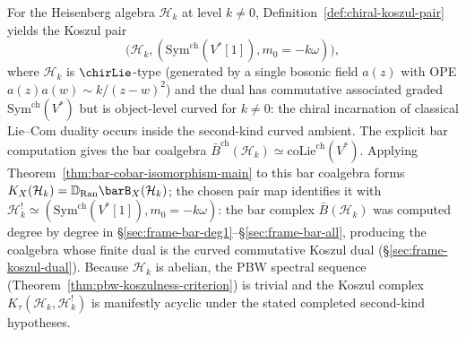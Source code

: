 \begin{example}\label{ex:heisenberg-koszul-pair}
For the Heisenberg algebra $\mathcal{H}_k$ at level $k \neq 0$,
Definition~\ref{def:chiral-koszul-pair} yields the Koszul pair
\[
\bigl(\mathcal{H}_k,
(\mathrm{Sym}^{\mathrm{ch}}(V^*[1]),m_0=-k\omega)\bigr),
\]
where $\mathcal{H}_k$ is $\chirLie$-type (generated by a single
bosonic field $a(z)$ with OPE $a(z)a(w) \sim k/(z-w)^2$)
and the dual has commutative associated graded
$\mathrm{Sym}^{\mathrm{ch}}(V^*)$ but is object-level curved for
$k\ne0$: the chiral incarnation of classical
$\mathrm{Lie}$--$\mathrm{Com}$ duality occurs inside the
second-kind curved ambient.
The explicit bar computation gives the bar coalgebra
$\bar{B}^{\mathrm{ch}}(\mathcal{H}_k) \simeq
\mathrm{coLie}^{\mathrm{ch}}(V^*)$.
Applying Theorem~\ref{thm:bar-cobar-isomorphism-main} to this bar
coalgebra forms
$K_X(\mathcal H_k)=\mathbb D_{\operatorname{Ran}}
\barB_X(\mathcal H_k)$; the chosen pair map identifies it with
$\mathcal{H}_k^!
\simeq(\mathrm{Sym}^{\mathrm{ch}}(V^*[1]),m_0=-k\omega)$:
the bar complex $\bar{B}(\mathcal{H}_k)$ was computed degree by
degree in \S\ref{sec:frame-bar-deg1}--\S\ref{sec:frame-bar-all},
producing the coalgebra whose finite dual is the curved
commutative Koszul dual
(\S\ref{sec:frame-koszul-dual}).
Because $\mathcal{H}_k$ is abelian, the PBW spectral sequence
(Theorem~\ref{thm:pbw-koszulness-criterion}) is trivial and the
Koszul complex $K_\tau(\mathcal{H}_k,
\mathcal H_k^!)$ is manifestly acyclic under the stated completed
second-kind hypotheses.
\end{example}

